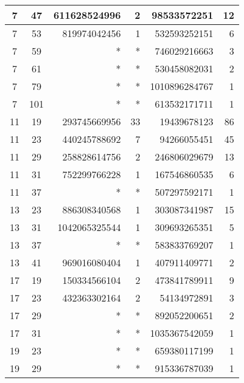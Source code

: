 \documentclass{mcom-l}
\theoremstyle{definition}
\begin{document}
\begin{longtable}[c]{| c | c || r | r | r | r |}
\hline
7	& 47	&  {611628524996}	& 2	& 98533572251	& 12\\
\hline
7	& 53	&  {819974042456}	& 1	&  {532593252151}	& 6\\
\hline
7	& 59	& *	& *	&  {746029216663}	& 3\\
\hline
7	& 61	& *	& *	&  {530458082031}	& 2\\
\hline
7	& 79	& *	& *	&  {1010896284767}	& 1\\
\hline
7	& 101	& *	& *	&  {613532171711}	& 1\\
\hline
11	& 19	&  {293745669956}	& 33	& 19439678123	& 86\\
\hline
11	& 23	&  {440245788692}	& 7	& 94266055451	& 45\\
\hline
11	& 29	&  {258828614756}	& 2	&  {246806029679}	& 13\\
\hline
11	& 31	&  {752299766228}	& 1	& 167546860535	& 6\\
\hline
11	& 37	& *	& *	&  {507297592171}	& 1\\
\hline
13	& 23	&  {886308340568}	& 1	&  {303087341987}	& 15\\
\hline
13	& 31	&  {1042065325544}	& 1	&  {309693265351}	& 5\\
\hline
13	& 37	& *	& *	&  {583833769207}	& 1\\
\hline
13	& 41	&  {969016080404}	& 1	&  {407911409771}	& 2\\
\hline
17	& 19	& 150334566104	& 2	&  {473841789911}	& 9\\
\hline
17	& 23	&  {432363302164}	& 2	& 54134972891	& 3\\
\hline
17	& 29	& *	& *	&  {892052200651}	& 2\\
\hline
17	& 31	& *	& *	&  {1035367542059}	& 1\\
\hline
19	& 23	& *	& *	&  {659380117199}	& 1\\
\hline
19	& 29	& *	& *	&  {915336787039}	& 1\\
\end{longtable}
\end{document}
